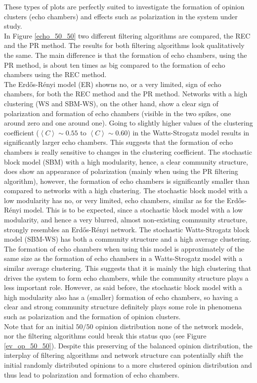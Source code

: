 \documentclass[11 pt , letterpaper , twoside , openright]{book}
\begin{document}
These types of plots are perfectly suited to investigate the formation of opinion clusters (echo chambers) and effects such as polarization in the system under study.\\
\newline
In Figure \ref{echo_50_50} two different filtering algorithms are compared, the REC and the PR method. The results for both filtering algorithms look qualitatively the same. The main difference is that the formation of echo chambers, using the PR method, is about ten times as big compared to the formation of echo chambers using the REC method. \\
The Erd\H{o}s-R\'{e}nyi model (ER) showns no, or a very limited, sign of echo chambers, for both the REC method and the PR method. Networks with a high clustering (WS and SBM-WS), on the other hand, show a clear sign of polarization and formation of echo chambers (visible in the two spikes, one around zero and one around one). Going to slightly higher values of the clustering coefficient ($\left<C\right> \sim 0.55$ to $\left<C\right> \sim 0.60$) in the Watts-Strogatz model results in significantly larger echo chambers. This suggests that the formation of echo chambers is really sensitive to changes in the clustering coefficient. The stochastic block model (SBM) with a high modularity, hence, a clear community structure, does show an appearance of polarization (mainly when using the PR filtering algorithm), however, the formation of echo chambers is significantly smaller than compared to networks with a high clustering. The stochastic block model with a low modularity has no, or very limited, echo chambers, similar as for the Erd\H{o}s-R\'{e}nyi   
model. This is to be expected, since a stochastic block model with a low modularity, and hence a very blurred, almost non-existing community structure, strongly resembles an Erd\H{o}s-R\'{e}nyi network. The stochastic Watts-Strogatz block model (SBM-WS) has both a community structure and a high average clustering. The formation of echo chambers when using this model is approximately of the same size as the formation of echo chambers in a Watts-Strogatz model with a similar average clustering. This suggests that it is mainly the high clustering that drives the system to form echo chambers, while the community structure plays a less important role. However, as said before, the stochastic block model with a high modularity also has a (smaller) formation of echo chambers, so having a clear and strong community structure definitely plays some role in phenomena such as polarization and the formation of opinion clusters. \\
Note that for an initial $50/50$ opinion distribution none of the network models, nor the filtering algorithms could break this status quo (see Figure \ref{ev_op_50_50}). Despite this preserving of the balanced opinion distribution, the interplay of filtering algorithms and network structure can potentially shift the initial randomly distributed opinions to a more clustered opinion distribution and thus lead to polarization and formation of echo chambers.
\end{document}
